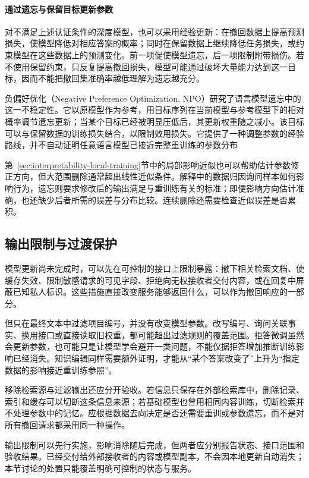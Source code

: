 \paragraph{通过遗忘与保留目标更新参数}

对不满足上述认证条件的深度模型，也可以采用经验更新：在撤回数据上提高预测损失，使模型降低对相应答案的概率；同时在保留数据上继续降低任务损失，或约束模型在这些数据上的预测变化。前一项促使模型遗忘，后一项限制附带损伤。若不使用保留约束，只反复提高撤回损失，模型可能通过破坏大量能力达到这一目标，因而不能把撤回集准确率越低理解为遗忘越充分。

负偏好优化（Negative Preference Optimization, NPO）研究了语言模型遗忘中的这一不稳定性。它以原模型作为参考，用目标序列在当前模型与参考模型下的相对概率调节遗忘更新；当某个目标已经被明显压低后，其更新权重随之减小。该目标可以与保留数据的训练损失结合，以限制效用损失。它提供了一种调整参数的经验路线，并不自动证明任意语言模型已接近完整重训练的参数分布

第~\ref{sec:interpretability-local-training}节中的局部影响近似也可以帮助估计参数修正方向，但大范围删除通常超出线性近似条件。解释中的数据归因询问样本如何影响行为，遗忘则要求修改后的输出满足与重训练有关的标准；即便影响方向估计准确，也还缺少后者所需的误差与分布比较。连续删除还需要检查近似误差是否累积。

\subsection{输出限制与过渡保护}
\label{sec:privacy-unlearning-output-control}

模型更新尚未完成时，可以先在可控制的接口上限制暴露：撤下相关检索文档、使缓存失效、限制敏感请求的可见字段、拒绝向无权接收者交付内容，或在回复中屏蔽已知私人标识。这些措施直接改变服务能够返回什么，可以作为撤回响应的一部分。

但只在最终文本中过滤项目编号，并没有改变模型参数。改写编号、询问关联事实、换用接口或直接读取旧权重，都可能超出过滤规则的覆盖范围。拒答微调虽然会更新参数，也可能只是让模型学会避开一类问题，不能仅据拒答增加推断训练影响已经消失。知识编辑同样需要额外证明，才能从“某个答案改变了”上升为“指定数据的影响接近重训练参照”。

移除检索源与过滤输出还应分开验收。若信息只保存在外部检索库中，删除记录、索引和缓存可以切断这条信息来源；若基础模型也曾用相同内容训练，切断检索并不处理参数中的记忆。应根据数据去向决定是否还需要重训或参数遗忘，而不是对所有撤回请求都采用同一种操作。

输出限制可以先行实施，影响消除随后完成，但两者应分别报告状态、接口范围和验收结果。已经交付给外部接收者的内容或模型副本，不会因本地更新自动消失；本节讨论的处置只能覆盖明确可控制的状态与服务。

